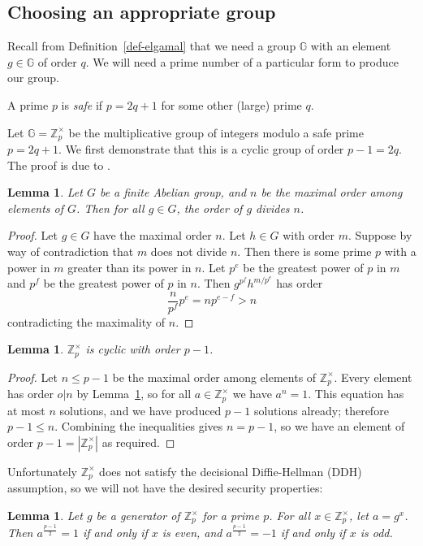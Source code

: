 \documentclass[12pt,a4paper]{article}
\newtheorem{lemma}[theorem]{Lemma}
\theoremstyle{definition}
\begin{document}
\subsection{Choosing an appropriate group}\label{app-elgamal-group}
Recall from Definition~\ref{def-elgamal} that we need a group $\mathbb{G}$ with an element $g\in\mathbb{G}$ of order $q$. We will need a prime number of a particular form to produce our group.
\begin{definition}
    A prime $p$ is \textit{safe} if $p=2q+1$ for some other (large) prime $q$.
\end{definition}
Let $\mathbb{G}=\mathbb{Z}^\times_p$ be the multiplicative group of integers modulo a safe prime $p=2q+1$. We first demonstrate that this is a cyclic group of order $p-1=2q$. The proof is due to \cite{cyclicity}.
\begin{lemma}\label{lem-order-divides}
    Let $G$ be a finite Abelian group, and $n$ be the maximal order among elements of $G$. Then for all $g\in G$, the order of $g$ divides $n$.
\end{lemma}
\begin{proof}
    Let $g\in G$ have the maximal order $n$. Let $h\in G$ with order $m$. Suppose by way of contradiction that $m$ does not divide $n$. Then there is some prime $p$ with a power in $m$ greater than its power in $n$. Let $p^e$ be the greatest power of $p$ in $m$ and $p^f$ be the greatest power of $p$ in $n$. Then $g^{p^f}h^{m/p^e}$ has order
    $$\frac{n}{p^f}p^e=np^{e-f}>n$$
    contradicting the maximality of $n$.
\end{proof}
\begin{lemma}
    $\mathbb{Z}^\times_p$ is cyclic with order $p-1$.
\end{lemma}
\begin{proof}
    Let $n\leq p-1$ be the maximal order among elements of $\mathbb{Z}^\times_p$. Every element has order $o\vert n$ by Lemma~\ref{lem-order-divides}, so for all $a\in\mathbb{Z}^\times_p$ we have $a^n=1$. This equation has at most $n$ solutions, and we have produced $p-1$ solutions already; therefore $p-1\leq n$.
    Combining the inequalities gives $n=p-1$, so we have an element of order $p-1=|\mathbb{Z}^\times_p|$ as required.
\end{proof}
Unfortunately $\mathbb{Z}^\times_p$ does not satisfy the decisional Diffie-Hellman (DDH) assumption, so we will not have the desired security properties:
\begin{lemma}\label{lem-parity}
    Let $g$ be a generator of $\mathbb{Z}^\times_p$ for a prime $p$. For all $x\in\mathbb{Z}^\times_p$, let $a=g^x$. Then $a^{\frac{p-1}{2}} = 1$ if and only if $x$ is even, and $a^{\frac{p-1}{2}} = -1$ if and only if $x$ is odd.
\end{lemma}
\end{document}
